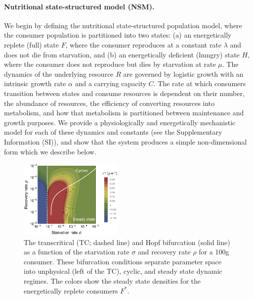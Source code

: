 \documentclass[twocolumn,preprintnumbers,amsmath,amssymb,superscriptaddress]{revtex4}
\begin{document}
\noindent \paragraph*{{\bf Nutritional state-structured model (NSM).}}
We begin by defining the nutritional state-structured population model, where the consumer population is partitioned into two states: (a) an
energetically replete (full) state $F$, where the consumer reproduces at a
constant rate $\lambda$ and does not die from starvation, and (b) an
energetically deficient (hungry) state $H$, where the consumer does not
reproduce but dies by starvation at rate $\mu$. The dynamics of the
underlying resource $R$ are governed by logistic growth with an intrinsic
growth rate $\alpha$ and a carrying capacity $C$. The rate at which consumers
transition between states and consume resources is dependent on their number,
the abundance of resources, the efficiency of converting resources into
metabolism, and how that metabolism is partitioned between maintenance and
growth purposes.  We provide a physiologically and energetically mechanistic
model for each of these dynamics and constants (see the Supplementary Information
(SI)), and show that the system produces a simple non-dimensional form which
we describe below.

\begin{figure}
\centering
\includegraphics[width=0.45\textwidth]{fig_FixedPoint2.eps}
\caption{\small{ The transcritical (TC; dashed line) and Hopf bifurcation (solid line) as a
  function of the starvation rate $\sigma$ and recovery rate $\rho$ for a 100g consumer.  These
  bifurcation conditions separate parameter space into unphysical (left of the TC), cyclic,
  and steady state dynamic regimes.  The colors show the steady state densities for the energetically replete consumers $F^*$.  
}\label{fig:fp}}
\end{figure}
\end{document}
